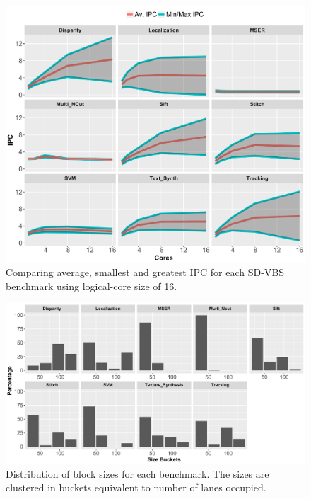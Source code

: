 \begin{figure}[t]
    \centering
    \includegraphics[width=1\textwidth]{cases-paper/graphics/Exploration/stddev3.pdf}
    \caption{Comparing average, smallest and greatest IPC for each SD-VBS benchmark using logical-core size of 16.}
    \label{fig:stddev}
		\vspace{5mm}
\end{figure}

\begin{figure}[t]
    \centering
    \includegraphics[width=1\textwidth]{cases-paper/graphics/Exploration/SizeBuckets.pdf}
    \caption{Distribution of block sizes for each benchmark. The sizes are clustered in buckets equivalent to number of lanes occupied.}
    \label{fig:block_sizes}
	\vspace{5mm}
\end{figure}

